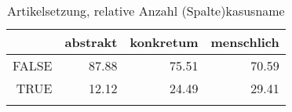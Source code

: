 \begin{table}[ht]
\centering
\begin{tabular}{rrrr}
  \lsptoprule
 & abstrakt & konkretum & menschlich \\ 
  \midrule
FALSE & 87.88 & 75.51 & 70.59 \\ 
  TRUE & 12.12 & 24.49 & 29.41 \\ 
   \lspbottomrule
\end{tabular}
\caption{Artikelsetzung, relative Anzahl (Spalte)kasusname} 
\end{table}
